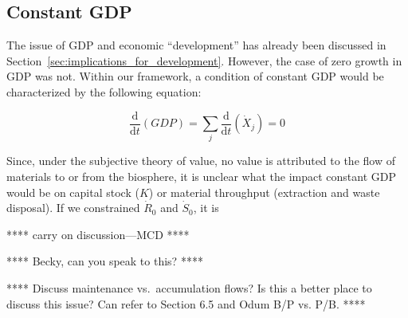 \subsection{Constant GDP}

The issue of GDP and economic ``development'' 
has already been discussed in 
Section~\ref{sec:implications_for_development}. 
However,
the case of zero growth in GDP was not.
Within our framework,
a condition of constant GDP would be
characterized by the following equation:

\begin{equation}\label{eq:const_GDP}
	\frac{\mathrm{d}}{\mathrm{d}t}\left(GDP\right)
	=	\sum\limits_{j}\frac{\mathrm{d}}{\mathrm{d}t}\left(\dot{X}_{j}\right)
	= 0
\end{equation}

Since,
under the subjective theory of value,
no value is attributed to the flow of materials
to or from the biosphere,
it is unclear what the impact constant GDP would be
on capital stock ($K$)
or material throughput
(extraction and waste disposal).
If we constrained $\dot{R}_{0}$ and
$\dot{S}_{0}$, it is 

**** carry on discussion---MCD ****

**** Becky, can you speak to this? ****

**** Discuss maintenance vs.\ accumulation flows? 
Is this a better place to discuss this issue? Can refer to
Section 6.5 and Odum B/P vs. P/B. ****

%


